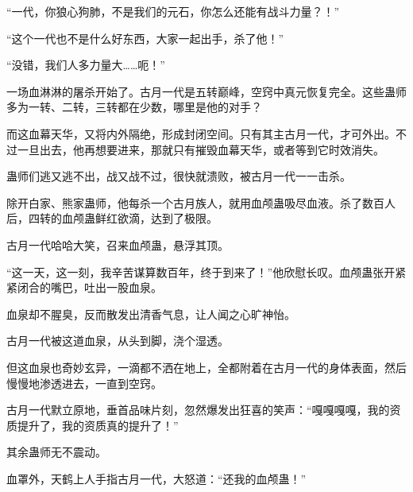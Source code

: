 \begin{this_body}
“一代，你狼心狗肺，不是我们的元石，你怎么还能有战斗力量？！”

“这个一代也不是什么好东西，大家一起出手，杀了他！”

“没错，我们人多力量大……呃！”

一场血淋淋的屠杀开始了。古月一代是五转巅峰，空窍中真元恢复完全。这些蛊师多为一转、二转，三转都在少数，哪里是他的对手？

而这血幕天华，又将内外隔绝，形成封闭空间。只有其主古月一代，才可外出。不过一旦出去，他再想要进来，那就只有摧毁血幕天华，或者等到它时效消失。

蛊师们逃又逃不出，战又战不过，很快就溃败，被古月一代一一击杀。

除开白家、熊家蛊师，他每杀一个古月族人，就用血颅蛊吸尽血液。杀了数百人后，四转的血颅蛊鲜红欲滴，达到了极限。

古月一代哈哈大笑，召来血颅蛊，悬浮其顶。

“这一天，这一刻，我辛苦谋算数百年，终于到来了！”他欣慰长叹。血颅蛊张开紧紧闭合的嘴巴，吐出一股血泉。

血泉却不腥臭，反而散发出清香气息，让人闻之心旷神怡。

古月一代被这道血泉，从头到脚，浇个湿透。

但这血泉也奇妙玄异，一滴都不洒在地上，全都附着在古月一代的身体表面，然后慢慢地渗透进去，一直到空窍。

古月一代默立原地，垂首品味片刻，忽然爆发出狂喜的笑声：“嘎嘎嘎嘎，我的资质提升了，我的资质真的提升了！”

其余蛊师无不震动。

血罩外，天鹤上人手指古月一代，大怒道：“还我的血颅蛊！”

\end{this_body}

